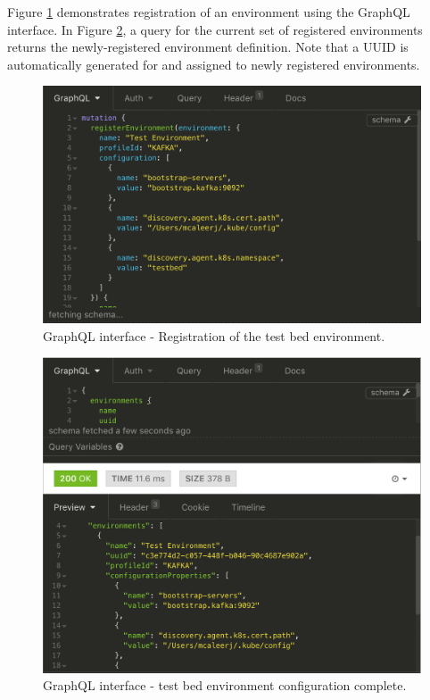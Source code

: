 \begin{enumerate}
\begin{itemize}
		Figure \ref{walkthrough_env_creation} demonstrates registration of an environment using the GraphQL interface. In Figure \ref{walkthrough_env_list}, a query for the current set of registered environments returns the newly-registered environment definition. Note that a UUID is automatically generated for and assigned to newly registered environments.
		 \vspace{5mm}
  \end{itemize}
 \begin{figure}[H]
	\centering  
	\includegraphics[scale=0.6]{figures/walkthrough/register_env.png}
	\caption{GraphQL interface - Registration of the test bed environment.}
	\label{walkthrough_env_creation}
\end{figure}

 \begin{figure}[H]
	\centering  
	\includegraphics[scale=0.6]{figures/walkthrough/list_envs.png}
	\caption{GraphQL interface - test bed environment configuration complete.}
	\label{walkthrough_env_list}
\end{figure}


\end{enumerate}
